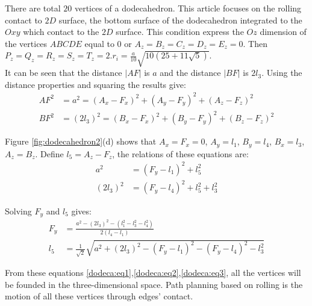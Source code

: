 \noindent There are total $20$ vertices of a dodecahedron. This article focuses on the rolling contact to $2D$ surface, the bottom surface of the dodecahedron integrated to the $Oxy$ which contact to the $2D$ surface. This condition express the $Oz$ dimension of the vertices $ABCDE$ equal to $0$ or $A_z = B_z = C_z = D_z = E_z = 0$. Then $P_z = Q_z = R_z = S_z = T_z = 2.r_i = \frac{a}{10}\sqrt{10(25+11\sqrt{5})}$.\\

\noindent It can be seen that the distance $|AF|$ is $a$ and the distance $|BF|$ is $2l_3$. Using the distance properties and squaring the results give:
\begin{equation} 
\label{dodeca:eq1}
\begin{split}
AF^2 & = a^2 = (A_x-F_x)^2 + (A_y-F_y)^2 + (A_z-F_z)^2 \\
BF^2 & = (2l_3)^2 = (B_x-F_x)^2 + (B_y-F_y)^2 + (B_z-F_z)^2
\end{split}
\end{equation}

\noindent Figure \ref{fig:dodecahedron2}(d) shows that $A_x = F_x = 0$, $A_y = l_1$, $B_y = l_4$, $B_x = l_3$, $A_z = B_z$. Define $l_5=A_z-F_z$, the relations of these equations are:
\begin{equation} 
\label{dodeca:eq2}
\begin{split}
a^2 & = (F_y-l_1)^2 + l_5^2\\
(2l_3)^2 & = (F_y-l_4)^2 + l_5^2 + l_3^2
\end{split}
\end{equation}

Solving $F_y$ and $l_5$ gives:
\begin{equation} 
\label{dodeca:eq3}
\begin{split}
F_y & = \frac{a^2-(2l_3)^2-(l_1^2-l_3^2-l_4^2)}{2(l_4-l_1)} \\
l_5 & = \frac{1}{\sqrt{2}}\sqrt{a^2+(2l_3)^2-(F_y-l_1)^2-(F_y-l_4)^2-l_3^2}
\end{split}
\end{equation}

\noindent From these equations \ref{dodeca:eq1},\ref{dodeca:eq2},\ref{dodeca:eq3}, all the vertices will be founded in the three-dimensional space. Path planning based on rolling is the motion of all these vertices through edges' contact.\\

